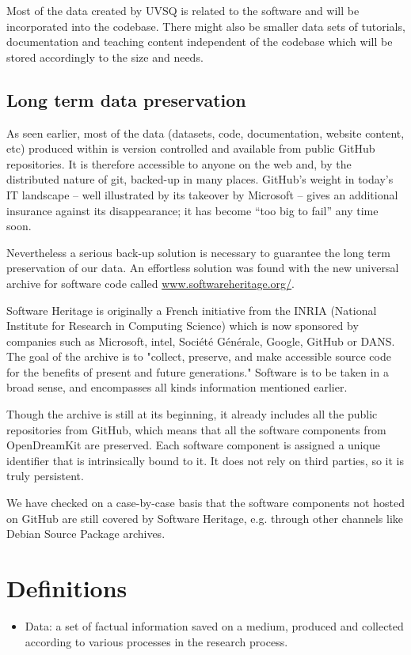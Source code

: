 \documentclass{deliverablereport}
\begin{document}
\begin{enumerate}
\begin{itemize}
Most of the data created by UVSQ is related to the software \Sage and will be incorporated into the \Sage codebase. There might also be smaller data sets of tutorials, documentation and teaching content independent of the \Sage codebase which will be stored accordingly to the size and needs.
\end{itemize}
\end{enumerate}

\subsection{Long term data preservation}

As seen earlier, most of the data (datasets, code, documentation,
website content, etc) produced within \ODK is version controlled and
available from public GitHub repositories. It is therefore accessible
to anyone on the web and, by the distributed nature of git, backed-up
in many places. GitHub's weight in today's IT landscape -- well
illustrated by its takeover by Microsoft -- gives an additional
insurance against its disappearance; it has become “too big to fail”
any time soon.

Nevertheless a serious back-up solution is necessary to guarantee the
long term preservation of our data. An effortless solution was found
with the new universal archive for software code called
\href{https://www.softwareheritage.org/}{www.softwareheritage.org/}.

Software Heritage is originally a French initiative from the INRIA
(National Institute for Research in Computing Science) which is now
sponsored by companies such as Microsoft, intel, Société Générale,
Google, GitHub or DANS. The goal of the archive is to "collect,
preserve, and make accessible source code for the benefits of present
and future generations." Software is to be taken in a broad sense, and
encompasses all kinds information mentioned earlier.

Though the archive is still at its beginning, it already includes all the public repositories from GitHub, which means that all the software components from OpenDreamKit are preserved. Each software component is assigned a unique identifier that is intrinsically bound to it. It does not rely on third parties, so it is truly persistent.

We have checked on a case-by-case basis that the software components
not hosted on GitHub are still covered by Software Heritage, e.g.
through other channels like Debian Source Package archives.


\section{Definitions}

\begin{itemize}
\item{Data:} a set of factual information saved on a medium, produced and collected according to various processes in the research process.
\end{itemize}
\end{document}
